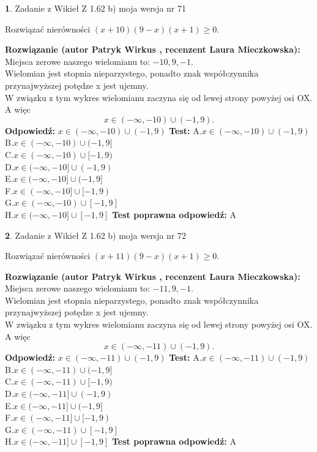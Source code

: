 \documentclass[12pt, a4paper]{article}
\theoremstyle{definition} %
\newtheorem{zad}{}
\newcommand{\zadStart}[1]{\begin{zad}#1\newline}
\newcommand{\zadStop}{\end{zad}}
\newcommand{\rozwStart}[2]{\noindent \textbf{Rozwiązanie (autor #1 , recenzent #2): }\newline}
\newcommand{\rozwStop}{\newline}
\newcommand{\odpStart}{\noindent \textbf{Odpowiedź:}\newline}
\newcommand{\odpStop}{\newline}
\newcommand{\testStart}{\noindent \textbf{Test:}\newline}
\newcommand{\testStop}{\newline}
\newcommand{\kluczStart}{\noindent \textbf{Test poprawna odpowiedź:}\newline}
\newcommand{\kluczStop}{\newline}
\begin{document}
\zadStart{Zadanie z Wikieł Z 1.62 b) moja wersja nr 71}

Rozwiązać nierówności $(x+10)(9-x)(x+1)\ge0$.
\zadStop
\rozwStart{Patryk Wirkus}{Laura Mieczkowska}
Miejsca zerowe naszego wielomianu to: $-10, 9, -1$.\\
Wielomian jest stopnia nieparzystego, ponadto znak współczynnika przy\linebreak najwyższej potędze x jest ujemny.\\ W związku z tym wykres wielomianu zaczyna się od lewej strony powyżej osi OX. A więc $$x \in (-\infty,-10) \cup (-1,9).$$
\rozwStop
\odpStart
$x \in (-\infty,-10) \cup (-1,9)$
\odpStop
\testStart
A.$x \in (-\infty,-10) \cup (-1,9)$\\
B.$x \in (-\infty,-10) \cup (-1,9]$\\
C.$x \in (-\infty,-10) \cup [-1,9)$\\
D.$x \in (-\infty,-10] \cup (-1,9)$\\
E.$x \in (-\infty,-10] \cup (-1,9]$\\
F.$x \in (-\infty,-10] \cup [-1,9)$\\
G.$x \in (-\infty,-10) \cup [-1,9]$\\
H.$x \in (-\infty,-10] \cup [-1,9]$
\testStop
\kluczStart
A
\kluczStop



\zadStart{Zadanie z Wikieł Z 1.62 b) moja wersja nr 72}

Rozwiązać nierówności $(x+11)(9-x)(x+1)\ge0$.
\zadStop
\rozwStart{Patryk Wirkus}{Laura Mieczkowska}
Miejsca zerowe naszego wielomianu to: $-11, 9, -1$.\\
Wielomian jest stopnia nieparzystego, ponadto znak współczynnika przy\linebreak najwyższej potędze x jest ujemny.\\ W związku z tym wykres wielomianu zaczyna się od lewej strony powyżej osi OX. A więc $$x \in (-\infty,-11) \cup (-1,9).$$
\rozwStop
\odpStart
$x \in (-\infty,-11) \cup (-1,9)$
\odpStop
\testStart
A.$x \in (-\infty,-11) \cup (-1,9)$\\
B.$x \in (-\infty,-11) \cup (-1,9]$\\
C.$x \in (-\infty,-11) \cup [-1,9)$\\
D.$x \in (-\infty,-11] \cup (-1,9)$\\
E.$x \in (-\infty,-11] \cup (-1,9]$\\
F.$x \in (-\infty,-11] \cup [-1,9)$\\
G.$x \in (-\infty,-11) \cup [-1,9]$\\
H.$x \in (-\infty,-11] \cup [-1,9]$
\testStop
\kluczStart
A
\kluczStop
\end{document}
